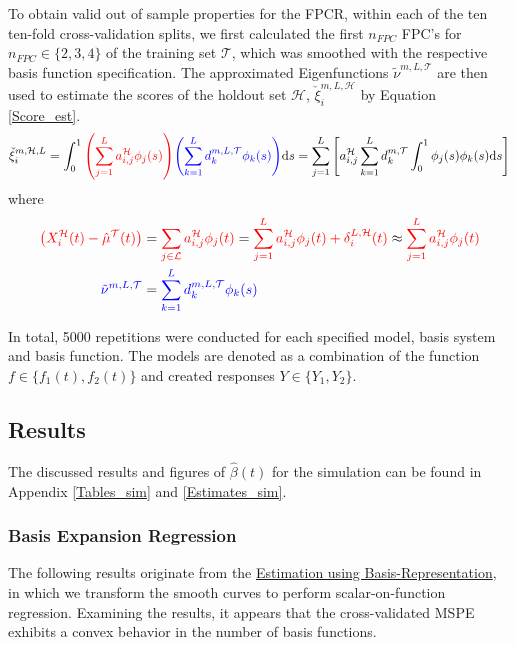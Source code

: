\documentclass[11pt,twoside,a4paper]{article}
\begin{document}
		To obtain valid out of sample properties for the FPCR, within each of the ten ten-fold cross-validation splits, we first calculated the first $n_{FPC}$ FPC's for $n_{FPC} \in \{2,3,4\}$ of the training set $\mathcal{T}$, which was smoothed with the respective basis function specification. The approximated Eigenfunctions $\tilde{\nu}^{m, L, \mathcal{T}}$ are then used to estimate the scores of the holdout set $\mathcal{H}$, $\check{\xi}_{i}^{m, L, \mathcal{H}}$  by Equation \ref{Score_est}.
		\begin{equation}\label{Score_est}
			\check{\xi}_{i}^{m, \mathcal{H},L}
			= \int_{0}^{1} {\color{red}\left(\sum_{j = 1}^{L} a_{i,j}^{\mathcal{H}} \phi_j(s)\right)} {\color{blue}\left(\sum_{k = 1}^{L} d_{k}^{m, L, \mathcal{T}} \phi_{k}(s)\right)} \mathrm{d}s
		    = \sum_{j = 1}^{L} \left[ a_{i,j}^{\mathcal{H}}\sum_{k = 1}^{L}  d_{k}^{m, \mathcal{T}} \int_{0}^{1} \phi_j(s) \phi_{k}(s)\mathrm{d}s\right]
		\end{equation}
		where 
		\begin{equation}
			\begin{split}
				{\color{red} \left(X_{i}^{\mathcal{H}}(t) - \hat{\mu}^{\mathcal{T}}(t)\right)} 
				&= {\color{red}\sum_{j \in \mathcal{L}} a_{i,j}^{\mathcal{H}} \phi_j(t)}
				= {\color{red}\sum_{j = 1}^{L} a_{i,j}^{\mathcal{H}} \phi_j(t) + \delta_{i}^{L, \mathcal{H}}(t)}
				\approx {\color{red}\sum_{j = 1}^{L} a_{i,j}^{\mathcal{H}} \phi_j(t)} \\
				{\color{blue}\tilde{\nu}^{m, L, \mathcal{T}} } &= {\color{blue}\sum_{k = 1}^{L} d_{k}^{m, L, \mathcal{T}} \phi_{k}(s)}
			\end{split}
		\end{equation}
		
		In total, 5000 repetitions were conducted for each specified model, basis system and basis function. The models are denoted as a combination of the function $f \in \{f_1(t), f_2(t)\}$	and created responses $Y \in \{Y_1, Y_2\}$.
		
	\subsection{Results}	
	The discussed results and figures of $\hat{\beta}(t)$ for the simulation can be found in Appendix \ref{Tables_sim} and \ref{Estimates_sim}.
	 
	\subsubsection{Basis Expansion Regression}
	The following results originate from the \hyperref[basis_exp_transf]{Estimation using Basis-Representation}, in which we transform the smooth curves to perform scalar-on-function regression. Examining the results, it appears that the cross-validated MSPE exhibits a convex behavior in the number of basis functions.
	
\end{document}

